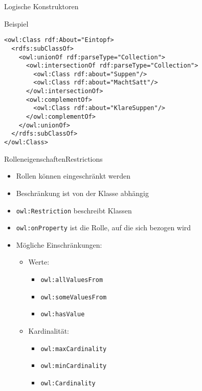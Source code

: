 \documentclass{beamer}
\begin{document}
%
\begin{frame}[fragile]{Logische Konstruktoren}
\begin{exampleblock}{Beispiel}
\begin{lstlisting}[lang="xml"]
<owl:Class rdf:About="Eintopf>
  <rdfs:subClassOf>
    <owl:unionOf rdf:parseType="Collection">
      <owl:intersectionOf rdf:parseType="Collection">
        <owl:Class rdf:about="Suppen"/>
        <owl:Class rdf:about="MachtSatt"/>
      </owl:intersectionOf>
      <owl:complementOf>
        <owl:Class rdf:about="KlareSuppen"/>
      </owl:complementOf>
    </owl:unionOf>
  </rdfs:subClassOf>
</owl:Class>
\end{lstlisting}
\end{exampleblock}

\end{frame}
%

\begin{frame}[fragile]{Rolleneigenschaften}{Restrictions}
\begin{itemize}
\item Rollen können eingeschränkt werden
\item Beschränkung ist von der Klasse abhängig
\item \texttt{owl:Restriction} beschreibt Klassen
\item \texttt{owl:onProperty} ist die Rolle, auf die sich bezogen wird
\item Mögliche Einschränkungen:
\begin{itemize}
\item Werte:
\begin{itemize}
\item \texttt{owl:allValuesFrom}
\item \texttt{owl:someValuesFrom}
\item \texttt{owl:hasValue}
\end{itemize}
\item Kardinalität:
\begin{itemize}
\item \texttt{owl:maxCardinality}
\item \texttt{owl:minCardinality}
\item \texttt{owl:Cardinality}
\end{itemize}

\end{itemize}

\end{itemize}


\end{frame}
%
\end{document}
